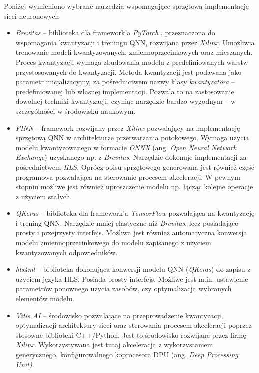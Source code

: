 Poniżej wymieniono wybrane narzędzia wspomagające sprzętową implementację sieci neuronowych
\begin{itemize}
    \item \emph{Brevitas}\cite{brevitas} -- biblioteka dla framework'a \emph{PyTorch} \cite{pytorch}, przeznaczona do wspomagania kwantyzacji i treningu QNN, rozwijana przez \emph{Xilinx}. Umożliwia trenowanie modeli kwantyzowanych, zmiennoprzecinkowych oraz mieszanych. Proces kwantyzacji wymaga zbudowania modelu z predefiniowanych warstw przystosowanych do kwantyzacji. 
    Metoda kwantyzacji jest podawana jako parametr inicjalizacyjny, za pośrednictwem nazwy klasy \emph{kwantyzatora} -- predefiniowanej lub własnej implementacji. 
    Pozwala to na zastosowanie dowolnej techniki kwantyzacji, czyniąc narzędzie bardzo wygodnym -- w szczególności w środowisku naukowym.
    
    \item \emph{FINN}\cite{finn} -- framework rozwijany przez \emph{Xilinx} pozwalający na implementację sprzętową QNN w architekturze przetwarzania potokowego. 
    Wymaga użycia modelu kwantyzowanego w formacie \emph{ONNX} (ang. \emph{Open Neural Network Exchange}) uzyskanego np. z \emph{Brevitas}.
    Narzędzie dokonuje implementacji za pośrednictwem \emph{HLS}. Oprócz opisu sprzętowego generowana jest również część programowa pozwalająca na sterowanie procesem akceleracji. 
    W pewnym stopniu możliwe jest również uproszczenie modelu np. łącząc kolejne operacje z użyciem stałych. 
    
    
    \item \emph{QKeras}\cite{qkeras} -- biblioteka dla framework'a \emph{TensorFlow}\cite{tf} pozwalająca na kwantyzację i trening QNN. Narzędzie mniej elastyczne niż \emph{Brevitas}, lecz posiadające prosty i przejrzysty interfejs. 
    Możliwa jest również automatyczna konwersja modelu zmiennoprzecinkowego do modelu zapisanego z użyciem kwantyzowanych odpowiedników.
    
    \item \emph{hls4ml}\cite{hls4ml} -- biblioteka dokonująca konwersji modelu QNN (\emph{QKeras}) do zapisu z użyciem języka HLS.
    Posiada prosty interfejs. 
    Możliwe jest m.in. ustawienie parametrów ponownego użycia zasobów, czy optymalizacja wybranych elementów modelu. 
    
    \item \emph{Vitis AI}\cite{vitis_ai} -- środowisko pozwalające na przeprowadzenie kwantyzacji, optymalizacji architektury sieci oraz sterowania procesem akceleracji poprzez stosowne biblioteki C++/Python. Jest to środowisko rozwijane przez firmę \emph{Xilinx}.
    Wykorzystywana jest tutaj akceleracja z wykorzystaniem generycznego, konfigurowalnego koprocesora DPU (ang.\textit{ Deep Processing Unit)}. 
    
\end{itemize}



